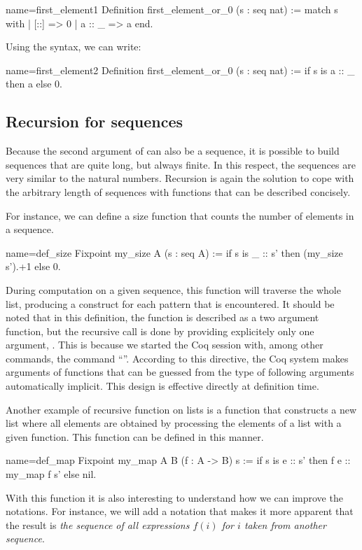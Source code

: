 \begin{coq}{name=first_element1}{}
Definition first_element_or_0 (s : seq nat) :=
  match s with
  | [::] => 0
  | a :: _ => a
  end.
\end{coq}
Using the  syntax, we can write:

\begin{coq}{name=first_element2}{}
Definition first_element_or_0 (s : seq nat) :=
  if s is a :: _ then a else 0.
\end{coq}
\subsection{Recursion for sequences}
Because the second argument of  can also be a sequence, it is
possible to build sequences that are quite long, but always finite.
In this respect, the sequences are very similar to the natural
numbers.  Recursion is again the solution to cope with the arbitrary
length of sequences with functions that can be described concisely.

For instance, we can define a size function that counts the number of
elements in a sequence.

\begin{coq}{name=def_size}{}
Fixpoint my_size A (s : seq A) :=
  if s is _ :: s' then (my_size s').+1 else 0.
\end{coq}
During computation on a given sequence, this function will traverse
the whole list, producing a  construct for each
 pattern that is encountered.  It should be noted that in this
definition, the function  is described as a two argument
function, but the recursive call  is done by providing
explicitely only one argument, .  This is because we started the
Coq session with, among other commands, the command ``''.  According to this directive, the Coq system makes
arguments of functions that can be guessed from the type of following
arguments automatically implicit.  This design is effective directly
at definition time.

Another example of recursive function on lists is a function that constructs
a new list where all elements are obtained by processing the elements
of a list with a given function.  This function can be defined in this
manner.

\begin{coq}{name=def_map}{}
Fixpoint my_map A B (f : A -> B) s :=
  if s is e :: s' then f e :: my_map f s' else nil.
\end{coq}
With this function it is also interesting to understand how we can
improve the notations.  For instance, we will add a notation that
makes it more apparent that the result is {\em the sequence of all
expressions \(f(i)\) for \(i\) taken from another sequence}.

